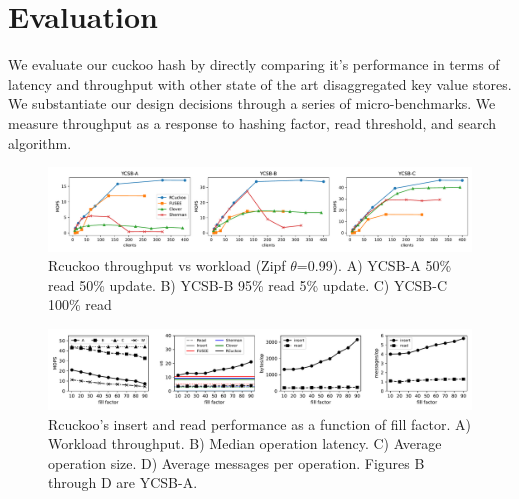 \section{Evaluation}
\label{sec:eval}

We evaluate our cuckoo hash by directly comparing it's
performance in terms of latency and throughput with other
state of the art disaggregated key value stores. We
substantiate our design decisions through a series of
micro-benchmarks. We measure throughput as a response to
hashing factor, read threshold, and search algorithm.

\begin{figure}[ht]
    \includegraphics[width=0.99\linewidth]{fig/hero_ycsb_throughput.pdf}

    \caption{Rcuckoo throughput vs workload (Zipf $\theta$=0.99). A) YCSB-A 50\%
    read 50\% update. B) YCSB-B 95\% read 5\% update. C)
    YCSB-C 100\% read}
    \label{fig:ycsb_throughput}
 \end{figure}

\begin{figure}[ht]
    \includegraphics[width=0.99\linewidth]{fig/hero_ycsb_fill.pdf}

    \caption{Rcuckoo's insert and read performance as a
    function of fill factor. A) Workload throughput. B)
    Median operation latency. C) Average operation size. D)
    Average messages per operation. Figures B through D are
    YCSB-A.}

    \label{fig:ycsb_fill}
\end{figure}


